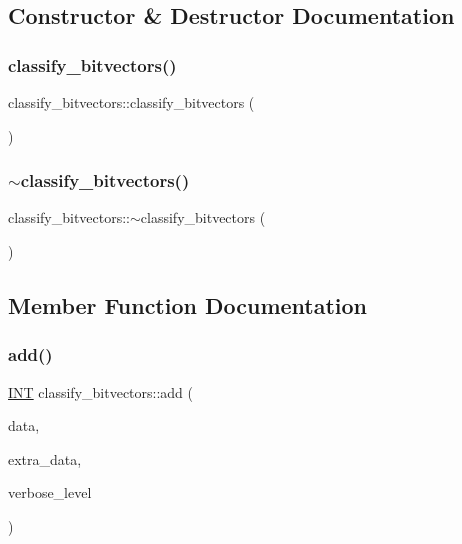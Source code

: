 \subsection{Constructor \& Destructor Documentation}
\mbox{\label{classclassify__bitvectors_a0586c94ccd360dbe71e2c97748084523}} 
\subsubsection{\texorpdfstring{classify\+\_\+bitvectors()}{classify\_bitvectors()}}
{\footnotesize\ttfamily classify\+\_\+bitvectors\+::classify\+\_\+bitvectors (\begin{DoxyParamCaption}{ }\end{DoxyParamCaption})}

\mbox{\label{classclassify__bitvectors_a272114ab3d1724a5dd36945815df5414}} 
\subsubsection{\texorpdfstring{$\sim$classify\+\_\+bitvectors()}{~classify\_bitvectors()}}
{\footnotesize\ttfamily classify\+\_\+bitvectors\+::$\sim$classify\+\_\+bitvectors (\begin{DoxyParamCaption}{ }\end{DoxyParamCaption})}



\subsection{Member Function Documentation}
\mbox{\label{classclassify__bitvectors_ade2600c6a1b57b9478cf3323fbd44de7}} 
\subsubsection{\texorpdfstring{add()}{add()}}
{\footnotesize\ttfamily \mbox{\hyperlink{galois_8h_a09fddde158a3a20bd2dcadb609de11dc}{I\+NT}} classify\+\_\+bitvectors\+::add (\begin{DoxyParamCaption}\item[{\mbox{\hyperlink{galois_8h_a122c4acf389c050379f00341fdcd5812}{U\+B\+Y\+TE}} $\ast$}]{data,  }\item[{void $\ast$}]{extra\+\_\+data,  }\item[{\mbox{\hyperlink{galois_8h_a09fddde158a3a20bd2dcadb609de11dc}{I\+NT}}}]{verbose\+\_\+level }\end{DoxyParamCaption})}


